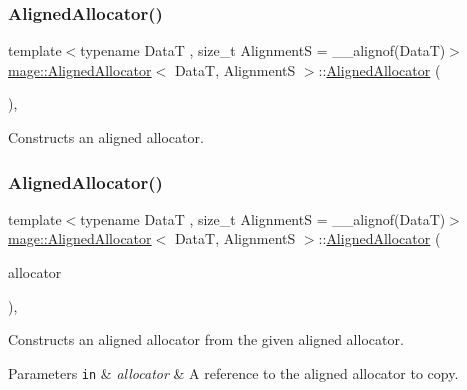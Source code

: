 \subsubsection{\texorpdfstring{Aligned\+Allocator()}{AlignedAllocator()}\hspace{0.1cm}{\footnotesize\ttfamily [1/4]}}
{\footnotesize\ttfamily template$<$typename DataT , size\+\_\+t AlignmentS = \+\_\+\+\_\+alignof(\+Data\+T)$>$ \\
\hyperlink{structmage_1_1_aligned_allocator}{mage\+::\+Aligned\+Allocator}$<$ DataT, AlignmentS $>$\+::\hyperlink{structmage_1_1_aligned_allocator}{Aligned\+Allocator} (\begin{DoxyParamCaption}{ }\end{DoxyParamCaption})\hspace{0.3cm}{\ttfamily [default]}, {\ttfamily [noexcept]}}

Constructs an aligned allocator. \hypertarget{structmage_1_1_aligned_allocator_a05c42833aa1391f95c3cd51be7c19273}{}\label{structmage_1_1_aligned_allocator_a05c42833aa1391f95c3cd51be7c19273} 
\subsubsection{\texorpdfstring{Aligned\+Allocator()}{AlignedAllocator()}\hspace{0.1cm}{\footnotesize\ttfamily [2/4]}}
{\footnotesize\ttfamily template$<$typename DataT , size\+\_\+t AlignmentS = \+\_\+\+\_\+alignof(\+Data\+T)$>$ \\
\hyperlink{structmage_1_1_aligned_allocator}{mage\+::\+Aligned\+Allocator}$<$ DataT, AlignmentS $>$\+::\hyperlink{structmage_1_1_aligned_allocator}{Aligned\+Allocator} (\begin{DoxyParamCaption}\item[{const \hyperlink{structmage_1_1_aligned_allocator}{Aligned\+Allocator}$<$ DataT, AlignmentS $>$ \&}]{allocator }\end{DoxyParamCaption})\hspace{0.3cm}{\ttfamily [default]}, {\ttfamily [noexcept]}}

Constructs an aligned allocator from the given aligned allocator.


\begin{DoxyParams}[1]{Parameters}
\mbox{\tt in}  & {\em allocator} & A reference to the aligned allocator to copy. \\
\hline
\end{DoxyParams}
\hypertarget{structmage_1_1_aligned_allocator_aefc95d55846c11bac240452247fab11e}{}\label{structmage_1_1_aligned_allocator_aefc95d55846c11bac240452247fab11e} 
